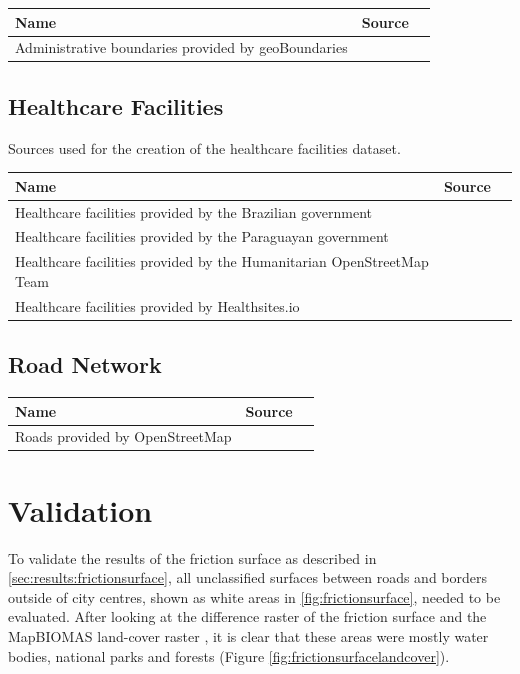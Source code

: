 \documentclass[11pt, a4paper]{report}
\begin{document}
\begin{longtable}{|p{3cm}|p{10cm}|l|}
    \hline
    \textbf{Name}& \textbf{Source}\\
    \hline
    Administrative boundaries provided by geoBoundaries & \citep{runfola_geoboundaries_2020}\\
    \hline
\end{longtable}


\section{Healthcare Facilities}
Sources used for the creation of the healthcare facilities dataset.
\begin{longtable}{|p{3cm}|p{10cm}|l|}
    \hline
    \textbf{Name}& \textbf{Source}\\
    \hline
    Healthcare facilities provided by the Brazilian government &\citep{ministerio_da_saude_hospitais_2024}\\
    \hline
    Healthcare facilities provided by the Paraguayan government& \citep{ministerio_de_salud_publica_mspbsgovpy_2024}\\
    \hline
    Healthcare facilities provided by the Humanitarian OpenStreetMap Team
    &\citep{humanitatiran_openstreetmap_team_hotosmorg_2024}\\
    \hline
    Healthcare facilities provided by Healthsites.io &\citep{hostettler_healthsitesio_2018}\\
    \hline
\end{longtable}


\section{Road Network}

\begin{longtable}{|p{3cm}|p{10cm}|l|}
    \hline
    \textbf{Name}& \textbf{Source} \\
    \hline
    Roads provided by OpenStreetMap
    & \citep{olbricht_drolbroverpass-api_2024}\\
    \hline

    
\end{longtable}

\chapter{Validation}\label{sec:validation:frictionsurface}
To validate the results of the friction surface as described in \ref{sec:results:frictionsurface}, all unclassified surfaces between roads and borders outside of city centres, shown as white areas in \ref{fig:frictionsurface}, needed to be evaluated.
After looking at the difference raster of the friction surface and the MapBIOMAS land-cover raster \citep{souza_reconstructing_2020}, it is clear that these areas were mostly water bodies, national parks and forests (Figure \ref{fig:frictionsurfacelandcover}). 
\end{document}
